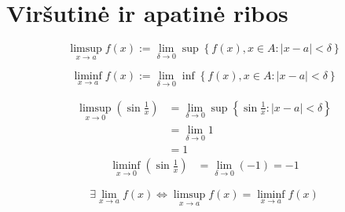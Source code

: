 \section{Viršutinė ir apatinė ribos}

\begin{defn}
  \begin{equation*}
    \limsup _{x \to a} f(x) := 
      \lim _{\delta \to 0} 
      \sup \left\{ f(x), x \in A : |x - a| < \delta \right\}
  \end{equation*}
\end{defn}

\begin{defn}
  \begin{equation*}
    \liminf _{x \to a} f(x) :=
      \lim _{\delta \to 0}
      \inf \left\{ f(x), x \in A : |x - a| < \delta \right\}
  \end{equation*}
\end{defn}

\begin{exmp}
  \begin{align*}
    \limsup _{x \to 0} \left( \sin \frac{1}{x} \right) 
    &= \lim _{\delta \to 0} \sup 
      \left\{ \sin \frac{1}{x} : |x - a| < \delta \right\} \\
    &= \lim _{\delta \to 0} 1 \\
    &= 1
  \end{align*}
  \begin{align*}
    \liminf _{x \to 0} \left( \sin \frac{1}{x} \right) 
    &= \lim _{\delta \to 0} (-1) = -1
  \end{align*}
\end{exmp}

\begin{prop}
  \begin{equation*}
    \exists \lim _{x \to a} f(x) \iff
    \limsup _{x \to a} f(x) = \liminf _{x \to a} f(x)
  \end{equation*}
\end{prop}
